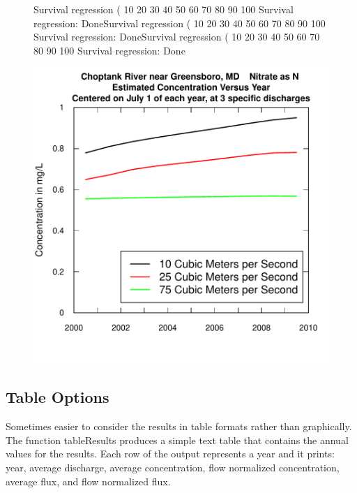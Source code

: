 \documentclass[a4paper,11pt]{article}
\begin{document}
\begin{figure}[htbp]
  \begin{minipage}[h]{0.5\linewidth}
    \begin{center}

\begin{Schunk}
\begin{Soutput}
Survival regression (%
10 	20 	30 	40 	50 	60 	70 	80 	90 	100 	
Survival regression: DoneSurvival regression (%
10 	20 	30 	40 	50 	60 	70 	80 	90 	100 	
Survival regression: DoneSurvival regression (%
10 	20 	30 	40 	50 	60 	70 	80 	90 	100 	
Survival regression: Done
\end{Soutput}
\end{Schunk}
\includegraphics{EGRET-figplotConcTimeSmooth}
    \label{fig:plotConcTimeSmooth}
    \end{center}
  \end{minipage}
  \hspace{0.5cm}
  \caption{}
  \label{fig:plotConcTimeSmoothAND}
\end{figure}

\FloatBarrier
\subsection{Table Options}
\label{sec:wrtdsTable}
Sometimes easier to consider the results in table formats rather than graphically. The function tableResults produces a simple text table that contains the annual values for the results.  Each row of the output represents a year and it prints: year, average discharge, average concentration, flow normalized concentration, average flux, and flow normalized flux.  
\end{document}

